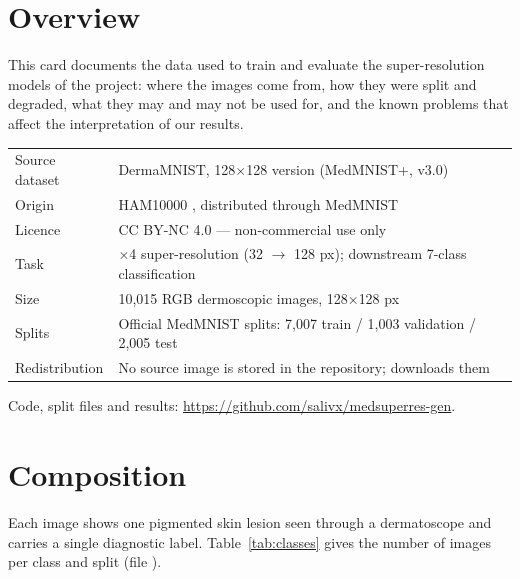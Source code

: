 \documentclass[11pt,a4paper]{article}
\begin{document}

\setcounter{page}{1}

\section{Overview}

This card documents the data used to train and evaluate the super-resolution models of the
project: where the images come from, how they were split and degraded, what they may and may not
be used for, and the known problems that affect the interpretation of our results.

\begin{table}[H]
\centering\small
\begin{tabularx}{\textwidth}{@{}p{3.3cm}L@{}}
\toprule
Source dataset & DermaMNIST, 128$\times$128 version (MedMNIST+, v3.0) \\
Origin & HAM10000 \cite{tschandl2018}, distributed through MedMNIST \cite{yang2023} \\
Licence & CC BY-NC 4.0 --- non-commercial use only \\
Task & $\times$4 super-resolution (32 $\to$ 128 px); downstream 7-class classification \\
Size & 10{,}015 RGB dermoscopic images, 128$\times$128 px \\
Splits & Official MedMNIST splits: 7{,}007 train / 1{,}003 validation / 2{,}005 test \\
Redistribution & No source image is stored in the repository;  downloads them \\
\bottomrule
\end{tabularx}
\end{table}

Code, split files and results: \url{https://github.com/salivx/medsuperres-gen}.

\section{Composition}\label{sec:comp}

Each image shows one pigmented skin lesion seen through a dermatoscope and carries a single
diagnostic label. Table~\ref{tab:classes} gives the number of images per class and split
(file ).
\end{document}
